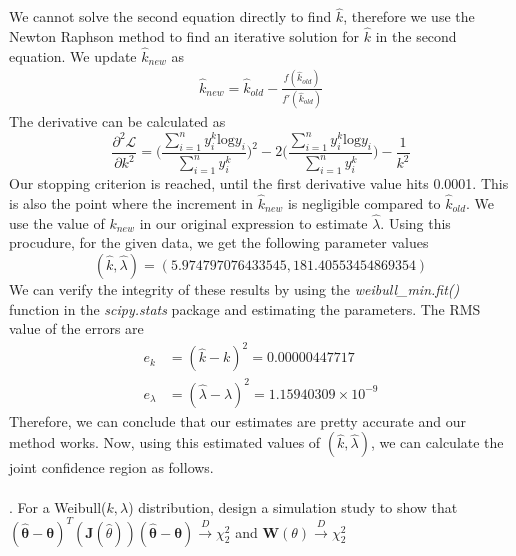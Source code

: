 \documentclass[11pt]{article}
\begin{document}
We cannot solve the second equation directly to find $\hat{k}$, therefore we use the Newton Raphson method to find an iterative solution for $\hat{k}$ in the second equation. We update $\hat{k}_{new}$ as
\begin{equation}
  \nonumber
  \begin{aligned}
    \hat{k}_{new} = \hat{k}_{old} - \frac{f(\hat{k}_{old})}{f'(\hat{k}_{old})}
  \end{aligned}
\end{equation}
The derivative can be calculated as
\begin{equation}
  \nonumber
  \frac{\partial^{2} \mathcal{L}}{\partial k^{2}} = \bigg(\frac{\sum_{i = 1}^{n}y_{i}^{k}\text{log}y_{i} }{\sum_{i = 1}^{n} y_{i}^{k}}\bigg)^{2} - 2\bigg(\frac{\sum_{i = 1}^{n}y_{i}^{k}\text{log}y_{i} }{\sum_{i = 1}^{n} y_{i}^{k}}\bigg) - \frac{1}{k^{2}}
\end{equation}
Our stopping criterion is reached, until the first derivative value hits 0.0001. This is also the point where the increment in $\hat{k}_{new}$ is negligible compared to $\hat{k}_{old}$. We use the value of $k_{new}$ in our original expression to estimate $\hat{\lambda}$. Using this procudure, for the given data, we get the following parameter values
\begin{equation}
  \nonumber
  (\hat{k}, \hat{\lambda}) = (5.974797076433545, 181.40553454869354)
\end{equation}
We can verify the integrity of these results by using the \emph{weibull\_min.fit()} function in the \emph{scipy.stats} package and estimating the parameters. The RMS value of the errors are
\begin{equation}
  \nonumber
  \begin{aligned}
    e_{k} & = (\hat{k} - k)^{2} = 0.00000447717\\
    e_{\lambda} & = (\hat{\lambda} - \lambda)^{2} = 1.15940309 \times 10^{-9}
  \end{aligned}
\end{equation}
Therefore, we can conclude that our estimates are pretty accurate and our method works. Now, using this estimated values of $(\hat{k}, \hat{\lambda})$, we can calculate the joint confidence region as follows. \\ \\
. For a Weibull($k, \lambda$) distribution, design a simulation study to show that $(\mathbf{\hat{\theta}} - \mathbf{\theta})^{T}(\mathbf{J}(\hat{\theta}))(\mathbf{\hat{\theta}} - \mathbf{\theta}) \xrightarrow{D} \chi^{2}_{2}$ and $\mathbf{W}(\theta) \xrightarrow{D} \chi^{2}_{2}$\\ \\
\end{document}

